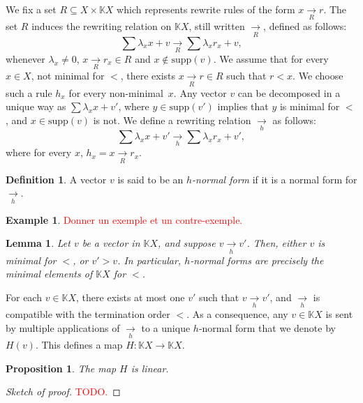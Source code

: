 \documentclass[10pt]{easychair}
\newtheorem{lemma}[theorem]{Lemma}
\newtheorem{proposition}[theorem]{Proposition}
\theoremstyle{definition}
\newtheorem{definition}[theorem]{Definition}
\newtheorem{example}[theorem]{Example}
\newcommand\K{\mathbb{K}}
\newcommand\KX{\K X}
\newcommand\supp{\text{supp}}
\newcommand\rewR{\underset{R}{\longrightarrow}}
\newcommand\rewh{\underset{h}{\longrightarrow}}
\newcommand\todo[1]{\textcolor{red}{#1.}}
\begin{document}
We fix a set $R\subseteq X\times\KX$ which represents rewrite rules of
the form $x\rewR r$. The set $R$ induces the rewriting relation on $\KX$,
still written $\rewR$, defined as follows:
\begin{equation}\label{equ:rewriting_step}
  \sum\lambda_xx+v\rewR\sum\lambda_xr_x+v,
\end{equation}
whenever $\lambda_x\neq 0$, $x\rewR r_x\in R$ and $x\notin\supp(v)$. We
assume that for every $x\in X$, not minimal for $<$, there exists
$x\rewR r\in R$ such that $r<x$. We choose such a rule $h_x$ for every
non-minimal~$x$. Any vector $v$ can be decomposed in a unique way as
$\sum\lambda_xx+v'$, where $y\in\supp(v')$ implies that $y$ is minimal
for $<$, and $x\in\supp(v)$ is not. We define a rewriting relation
$\rewh$ as follows:
\begin{equation}\label{equ:well-formed_rewriting_step}
  \sum\lambda_xx+v'\rewh\sum\lambda_xr_x+v',
\end{equation}
where for every $x$, $h_x=x \rewR r_x$.

\medskip

\begin{definition}
  A vector $v$ is said to be an \emph{$h$-normal form} if it is a normal
  form for $\rewh$.
\end{definition}


\begin{example}
\todo{Donner un exemple et un contre-exemple}
\end{example}


\begin{lemma}\label{lem:h_normal_forms}
  Let $v$ be a vector in $\KX$, and suppose $v\rewh v'$. Then, either $v$
  is minimal for $<$, or $v' > v$. In particular, $h$-normal forms are
  precisely the minimal elements of $\KX$ for $<$.
\end{lemma}

For each $v\in\KX$, there exists at most one $v'$ such that $v \rewh v'$,
and $\rewh$ is compatible with the termination order $<$. As a
consequence, any $v \in \KX$ is sent by multiple applications of $\rewh$
to a unique $h$-normal form that we denote by $H(v)$. This defines a map
$H : \KX \to \KX$.  

\begin{proposition}\label{prop:linearity_of_H}
  The map $H$ is linear.
\end{proposition}

\begin{proof}[Sketch of proof]
  \todo{TODO}
\end{proof}
\end{document}
